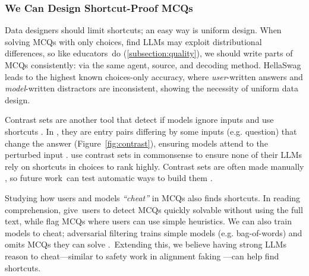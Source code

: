\subsubsection{We Can Design Shortcut-Proof MCQs} \label{subsubsection:shortcut_dataset}

Data designers should limit shortcuts; an easy way is
uniform design.
When solving MCQs with only choices,
\citet{Balepur2024ArtifactsOA} find LLMs may exploit distributional
differences, so like educators~do (\cref{subsection:quality}), we should write parts of MCQs consistently: via the same agent, source, and decoding method.
%
HellaSwag \cite{zellers2019hellaswag} leads to the highest known choices-only accuracy, where \textit{user}-written answers and \textit{model}-written distractors are inconsistent, showing the necessity of uniform data design.

Contrast sets are another tool that detect if models ignore inputs and use shortcuts \cite{Gardner2020EvaluatingML}.
%
In \mcqa, they are entry pairs differing by some inputs (e.g. question)
that change the answer (Figure~\ref{fig:contrast}), ensuring models attend to the perturbed input
\cite{elazar2023measuring}.
%
\citet{balepur2024your} use contrast sets in commonsense \mcqa to
ensure none of their LLMs rely on shortcuts in choices to rank
highly.
%
Contrast sets are often made manually \cite{Kaushik2020Learning}, so future work~can test
automatic ways to build them \cite{li-etal-2020-linguistically}.



Studying how users and models \textit{``cheat''}
\cite{saxon-etal-2023-peco} in MCQs also finds shortcuts.
%
In reading comprehension, \citet{Pang2021QuALITYQA} give~users  to detect MCQs quickly solvable without using the full text, while \citet{Malaviya2022CascadingBI} flag MCQs where users
can use simple heuristics.
%
We can also train models to cheat; adversarial
filtering trains simple models
(e.g. bag-of-words) and omits MCQs they can solve \cite{zellers2018swag}.~Extending this, we believe having strong LLMs reason to cheat---similar to safety work in alignment faking
\cite{greenblatt2024alignment}---can help find shortcuts.
